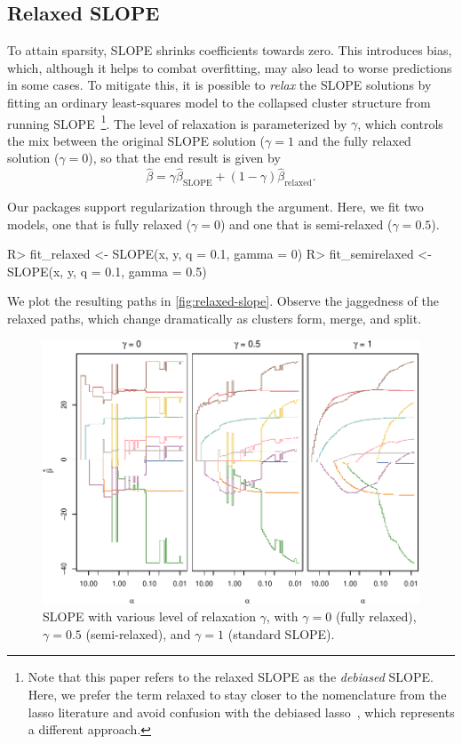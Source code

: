 \documentclass[article]{jss}
\makeatletter
\let\natwidth\Gin@nat@width
\makeatother
\begin{document}

\subsection{Relaxed SLOPE}

To attain sparsity, SLOPE shrinks coefficients towards zero. This introduces
bias, which, although it helps to combat overfitting, may also lead to
worse predictions in some cases. To mitigate this, it is possible
to \emph{relax} the SLOPE solutions by fitting an ordinary least-squares
model to the collapsed cluster structure from running SLOPE~\citep{skalski2022}\footnote{
  Note that this paper refers to the relaxed SLOPE as the \emph{debiased} SLOPE. Here,
  we prefer the term relaxed to stay closer to the nomenclature from the lasso literature and
  avoid confusion with the debiased lasso~\citep{geer2014}, which represents a different approach.}.
The level of relaxation is parameterized by \(\gamma\), which controls the mix between the
original SLOPE solution (\(\gamma = 1\) and the fully relaxed
solution (\(\gamma = 0\)), so that
the end result is given by
\[
  \hat{\beta} = \gamma \hat{\beta}_\text{SLOPE} + (1 - \gamma) \hat{\beta}_\text{relaxed}.
\]

Our packages support regularization through the  argument.
Here, we fit two models, one that is fully relaxed
(\(\gamma = 0\)) and one that is semi-relaxed (\(\gamma = 0.5\)).

\begin{Code}
R> fit_relaxed <- SLOPE(x, y, q = 0.1, gamma = 0)
R> fit_semirelaxed <- SLOPE(x, y, q = 0.1, gamma = 0.5)
\end{Code}

We plot the resulting paths in \autoref{fig:relaxed-slope}. Observe
the jaggedness of the relaxed paths, which change dramatically
as clusters form, merge, and split.

\begin{figure}[tp]
  \centering
  \includegraphics[width=\natwidth]{images/slope-relaxed.pdf}
  \caption{%
    SLOPE with various level of relaxation \(\gamma\), with
    \(\gamma = 0\) (fully relaxed), \(\gamma = 0.5\) (semi-relaxed),
    and \(\gamma = 1\) (standard SLOPE).
  }
  \label{fig:relaxed-slope}
\end{figure}
\end{document}
